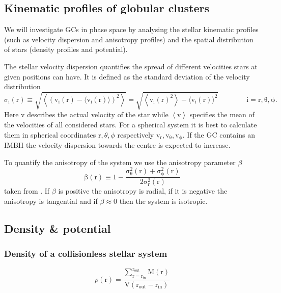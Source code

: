 \subsection{Kinematic profiles of globular clusters}\label{kin_prof_theory}
We will investigate \acp{GC} in phase space by analysing the stellar kinematic profiles (such as velocity dispersion and anisotropy profiles) and the spatial distribution of stars (density profiles and potential). 
\par The stellar velocity dispersion quantifies the spread of different velocities stars at given positions can have. It is defined as the standard deviation of the velocity distribution  
\begin{equation}\label{eq:vel_disp}
\sigma_\mathrm{i}(\mathrm{r})\equiv\sqrt{\left\langle(\mathrm{v_i}(\mathrm{r})-\langle \mathrm{v_i}(\mathrm{r})\rangle)^2\right\rangle}=\sqrt{\left\langle \mathrm{v_i}(\mathrm{r})^2\right\rangle-\langle \mathrm{v_i}(\mathrm{r})\rangle^2} \qquad\qquad \mathrm{i=r,\theta,\phi}.
\end{equation} Here v describes the actual velocity of the star while \(\left\langle \mathrm{v}\right\rangle\) specifies the mean of the velocities of all considered stars. For a spherical system it is best to calculate them in spherical coordinates \(\mathrm{r},\theta,\phi\) respectively \(\mathrm{v_r,v_{\theta},v_{\phi}}\). If the \ac{GC} contains an \ac{IMBH} the velocity dispersion towards the centre is expected to increase. 
\par To quantify the anisotropy of the system we use the anisotropy parameter \(\beta\) 
\begin{equation}\label{eq:anisotropy}
\mathrm{\beta(r)\equiv1-\frac{\sigma_\theta ^2(r)+\sigma_\phi ^2(r)}{2\sigma_r ^2(r)}}
\end{equation} taken from \citep[eq. 4.61]{2008gady.book.....B}. If \(\beta\) is positive the anisotropy is radial, if it is negative the anisotropy is tangential and if \(\beta\approx0\) then the system is isotropic.
\subsection{Density \& potential}\label{dens_pot_theory}
\subsubsection{Density of a collisionless stellar system}
\begin{equation}\label{eq:density}
\rho(\mathrm{r})=\frac{\sum_{\mathrm{r=r_{in}}}^{\mathrm{r_{out}}}\mathrm{M(r)}}{\mathrm{V(r_{out}-r_{in})}}
\end{equation}

